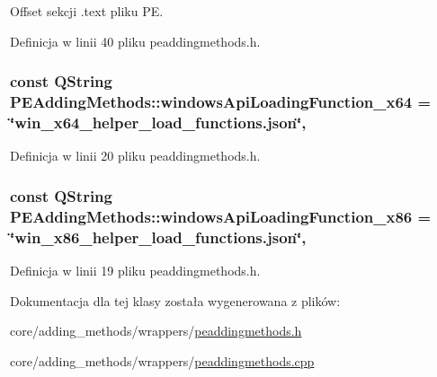 Offset sekcji .text pliku P\-E. 



Definicja w linii 40 pliku peaddingmethods.\-h.

\hypertarget{class_p_e_adding_methods_a14df5f95fc35d203e3176e0381b109ef}{
\subsubsection[{windows\-Api\-Loading\-Function\-\_\-x64}]{\setlength{\rightskip}{0pt plus 5cm}const Q\-String P\-E\-Adding\-Methods\-::windows\-Api\-Loading\-Function\-\_\-x64 = \char`\"{}win\-\_\-x64\-\_\-helper\-\_\-load\-\_\-functions.\-json\char`\"{}\hspace{0.3cm}{\ttfamily [static]}, {\ttfamily [private]}}}\label{class_p_e_adding_methods_a14df5f95fc35d203e3176e0381b109ef}


Definicja w linii 20 pliku peaddingmethods.\-h.

\hypertarget{class_p_e_adding_methods_a870bc9dab219ab4fa3908b798060abf3}{
\subsubsection[{windows\-Api\-Loading\-Function\-\_\-x86}]{\setlength{\rightskip}{0pt plus 5cm}const Q\-String P\-E\-Adding\-Methods\-::windows\-Api\-Loading\-Function\-\_\-x86 = \char`\"{}win\-\_\-x86\-\_\-helper\-\_\-load\-\_\-functions.\-json\char`\"{}\hspace{0.3cm}{\ttfamily [static]}, {\ttfamily [private]}}}\label{class_p_e_adding_methods_a870bc9dab219ab4fa3908b798060abf3}


Definicja w linii 19 pliku peaddingmethods.\-h.



Dokumentacja dla tej klasy została wygenerowana z plików\-:\begin{DoxyCompactItemize}
\item 
core/adding\-\_\-methods/wrappers/\hyperlink{peaddingmethods_8h}{peaddingmethods.\-h}\item 
core/adding\-\_\-methods/wrappers/\hyperlink{peaddingmethods_8cpp}{peaddingmethods.\-cpp}\end{DoxyCompactItemize}
